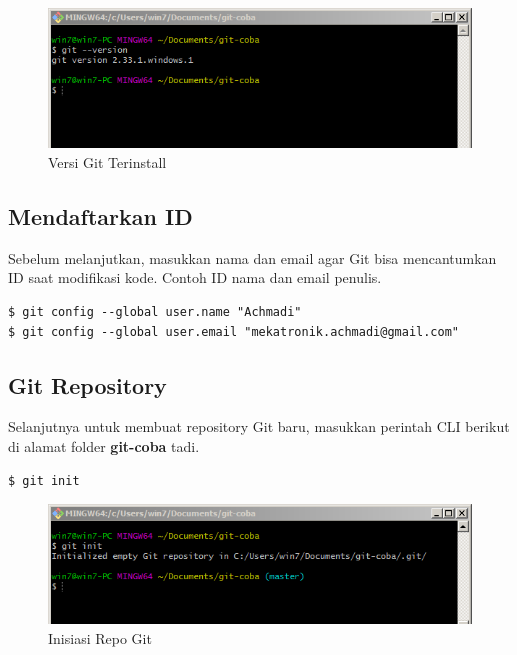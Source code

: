 \documentclass[12pt]{book}
\begin{document}
	\begin{figure}[!ht]
		\centering
		\includegraphics[width=400pt]{images/git0}
		\caption{Versi Git Terinstall}
	\end{figure}

	\subsection{Mendaftarkan ID}

	Sebelum melanjutkan, masukkan nama dan email agar Git bisa mencantumkan ID saat modifikasi kode.
	Contoh ID nama dan email penulis.
	\begin{verbatim}
$ git config --global user.name "Achmadi"
$ git config --global user.email "mekatronik.achmadi@gmail.com"
	\end{verbatim}

	\subsection{Git Repository}

	Selanjutnya untuk membuat repository Git baru, masukkan perintah CLI berikut di alamat folder \textbf{git-coba} tadi.
	\begin{verbatim}
$ git init
	\end{verbatim}

	\begin{figure}[!ht]
		\centering
		\includegraphics[width=400pt]{images/git1}
		\caption{Inisiasi Repo Git}
	\end{figure}
\end{document}
